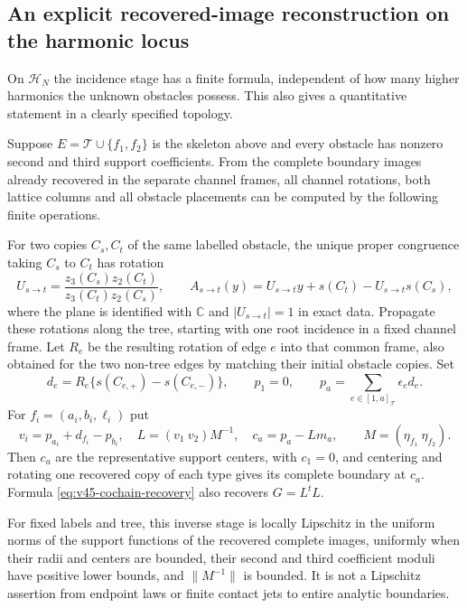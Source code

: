 \subsection{An explicit recovered-image reconstruction on the harmonic locus}

On $\mathscr H_N$ the incidence stage has a finite formula, independent of
how many higher harmonics the unknown obstacles possess.  This also gives
a quantitative statement in a clearly specified topology.

\begin{proposition}
\label{prop:v45-explicit-image-inverse}
Suppose $E=\mathcal T\cup\{f_1,f_2\}$ is the skeleton above and every
obstacle has nonzero second and third support coefficients.  From the
complete boundary images already recovered in the separate channel frames,
all channel rotations, both lattice columns and all obstacle placements can
be computed by the following finite operations.

For two copies $C_s,C_t$ of the same labelled obstacle, the unique proper
congruence taking $C_s$ to $C_t$ has rotation
\begin{equation}\label{eq:v45-general-registration}
 U_{s\to t}=\frac{z_3(C_s)z_2(C_t)}{z_3(C_t)z_2(C_s)},\qquad
 A_{s\to t}(y)=U_{s\to t}y+s(C_t)-U_{s\to t}s(C_s),
\end{equation}
where the plane is identified with $\mathbb C$ and $|U_{s\to t}|=1$ in
exact data.  Propagate these rotations along the tree, starting with one
root incidence in a fixed channel frame.  Let $R_e$ be the resulting
rotation of edge $e$ into that common frame, also obtained for the two
non-tree edges by matching their initial obstacle copies.  Set
\begin{equation}\label{eq:v45-displacement-cochain}
 d_e=R_e\{s(C_{e,+})-s(C_{e,-})\},\qquad
 p_1=0,\qquad
 p_a=\sum_{e\in[1,a]_{\mathcal T}}\epsilon_e d_e.
\end{equation}
For $f_i=(a_i,b_i,\ell_i)$ put
\begin{equation}\label{eq:v45-cochain-recovery}
 v_i=p_{a_i}+d_{f_i}-p_{b_i},\quad
 L=(v_1\ v_2)M^{-1},\quad
 c_a=p_a-Lm_a,
 \qquad M=(\eta_{f_1}\ \eta_{f_2}).
\end{equation}
Then $c_a$ are the representative support centers, with $c_1=0$, and
centering and rotating one recovered copy of each type gives its complete
boundary at $c_a$.  Formula \eqref{eq:v45-cochain-recovery} also recovers
$G=L^tL$.

For fixed labels and tree, this inverse stage is locally Lipschitz in the
uniform norms of the support functions of the recovered complete images,
uniformly when their radii and centers are bounded, their second and third
coefficient moduli have positive lower bounds, and $\|M^{-1}\|$ is bounded.
It is not a Lipschitz assertion from endpoint laws or finite contact jets
to entire analytic boundaries.
\end{proposition}

